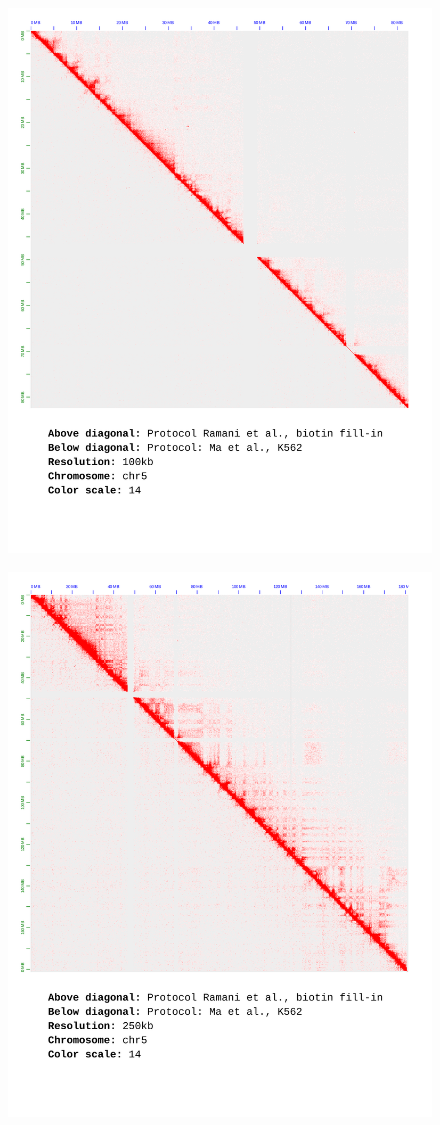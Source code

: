 \documentclass[a4paper,14pt]{extarticle}
\begin{document}
\begin{figure}[hp!] \includegraphics[width=1\textwidth]{s5_s30_chr5_100kb_14.pdf} \end{figure}

\begin{figure}[hp!] \includegraphics[width=1\textwidth]{s5_s30_chr5_500-100kb_14.pdf} \end{figure}
\end{document}

